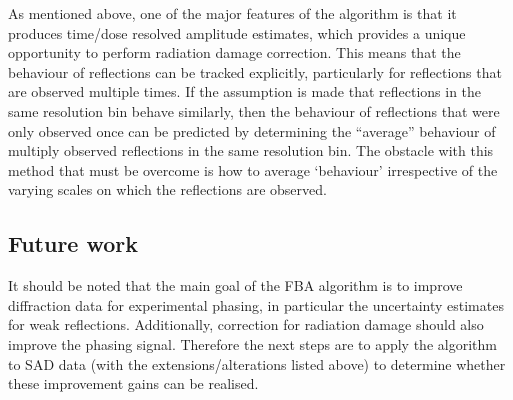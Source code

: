 As mentioned above, one of the major features of the algorithm is that it produces time/dose resolved amplitude estimates, which provides a unique opportunity to perform radiation damage correction.
This means that the behaviour of reflections can be tracked explicitly, particularly for reflections that are observed multiple times.
If the assumption is made that reflections in the same resolution bin behave similarly, then the behaviour of reflections that were only observed once can be predicted by determining the ``average'' behaviour of multiply observed reflections in the same resolution bin.
The obstacle with this method that must be overcome is how to average `behaviour' irrespective of the varying scales on which the reflections are observed.

\subsection{Future work}
\label{sub:Future work}
It should be noted that the main goal of the FBA algorithm is to improve diffraction data for experimental phasing, in particular the uncertainty estimates for weak reflections.
Additionally, correction for radiation damage should also improve the phasing signal.
Therefore the next steps are to apply the algorithm to SAD data (with the extensions/alterations listed above) to determine whether these improvement gains can be realised.
